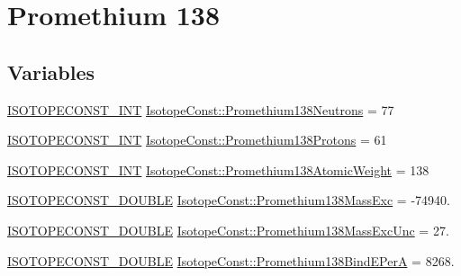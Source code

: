 \hypertarget{group___isotope_const-_promethium-_pm138}{}\section{Promethium 138}
\label{group___isotope_const-_promethium-_pm138}
\subsection*{Variables}
\begin{DoxyCompactItemize}
\item 
\mbox{\hyperlink{group___isotope_const-_macros_ga5f18360b3e99483a35c32d789e62621c}{I\+S\+O\+T\+O\+P\+E\+C\+O\+N\+S\+T\+\_\+\+I\+NT}} \mbox{\hyperlink{group___isotope_const-_promethium-_pm138_ga282c929162efffa9ae75f370c3038acc}{Isotope\+Const\+::\+Promethium138\+Neutrons}} = 77
\item 
\mbox{\hyperlink{group___isotope_const-_macros_ga5f18360b3e99483a35c32d789e62621c}{I\+S\+O\+T\+O\+P\+E\+C\+O\+N\+S\+T\+\_\+\+I\+NT}} \mbox{\hyperlink{group___isotope_const-_promethium-_pm138_gadeb5deba23b1aa231e5b5a5f015ab556}{Isotope\+Const\+::\+Promethium138\+Protons}} = 61
\item 
\mbox{\hyperlink{group___isotope_const-_macros_ga5f18360b3e99483a35c32d789e62621c}{I\+S\+O\+T\+O\+P\+E\+C\+O\+N\+S\+T\+\_\+\+I\+NT}} \mbox{\hyperlink{group___isotope_const-_promethium-_pm138_ga43ca2c17019b5718126419973ca245c9}{Isotope\+Const\+::\+Promethium138\+Atomic\+Weight}} = 138
\item 
\mbox{\hyperlink{group___isotope_const-_macros_ga8f45a7272ce02c0b4c65c44636ed719a}{I\+S\+O\+T\+O\+P\+E\+C\+O\+N\+S\+T\+\_\+\+D\+O\+U\+B\+LE}} \mbox{\hyperlink{group___isotope_const-_promethium-_pm138_ga419a9439bfa0e5a7499edc2b2c0e02a9}{Isotope\+Const\+::\+Promethium138\+Mass\+Exc}} = -\/74940.
\item 
\mbox{\hyperlink{group___isotope_const-_macros_ga8f45a7272ce02c0b4c65c44636ed719a}{I\+S\+O\+T\+O\+P\+E\+C\+O\+N\+S\+T\+\_\+\+D\+O\+U\+B\+LE}} \mbox{\hyperlink{group___isotope_const-_promethium-_pm138_ga5b9ccf97a0d5866be8d50b5531c13af3}{Isotope\+Const\+::\+Promethium138\+Mass\+Exc\+Unc}} = 27.
\item 
\mbox{\hyperlink{group___isotope_const-_macros_ga8f45a7272ce02c0b4c65c44636ed719a}{I\+S\+O\+T\+O\+P\+E\+C\+O\+N\+S\+T\+\_\+\+D\+O\+U\+B\+LE}} \mbox{\hyperlink{group___isotope_const-_promethium-_pm138_ga49d031e918e124153b5d39e87b841766}{Isotope\+Const\+::\+Promethium138\+Bind\+E\+PerA}} = 8268.

\end{DoxyCompactItemize}
